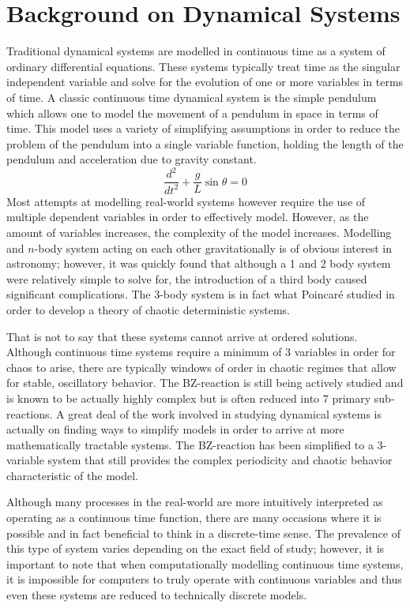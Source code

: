 \section{Background on Dynamical Systems}
Traditional dynamical systems are modelled in continuous time as a system of ordinary differential equations. These systems typically treat time as the singular independent variable and solve for the evolution of one or more variables in terms of time. A classic continuous time dynamical system is the simple pendulum which allows one to model the movement of a pendulum in space in terms of time. This model uses a variety of simplifying assumptions in order to reduce the problem of the pendulum into a single variable function, holding the length of the pendulum and acceleration due to gravity constant.
\begin{equation}
    \frac{d^2}{dt^2}+\frac{g}{L}\sin\theta=0
\end{equation}
Most  attempts  at  modelling  real-world  systems  however  require  the  use  of  multiple dependent variables in order to effectively model.  However, as the amount of variables increases, the complexity of the model increases.  Modelling and $n$-body system acting on each other gravitationally is of obvious interest in astronomy; however, it was quickly found  that  although  a  1  and  2  body  system  were  relatively  simple  to  solve  for,  the introduction of a third body caused significant complications.  The 3-body system is in fact what Poincar\'e studied in order to develop a theory of chaotic deterministic systems\autocite{Poincare1993}.

That is not to say that these systems cannot arrive at ordered solutions.  Although continuous time systems require a minimum of 3 variables in order for chaos to arise, there are typically windows of order in chaotic regimes that allow for stable, oscillatory behavior. The BZ-reaction is still being actively studied and is known to be actually highly complex but is often reduced into 7 primary sub-reactions\autocite{Field1986}. A great deal of the work involved in studying dynamical systems is actually on finding ways to simplify models in order to arrive at more mathematically tractable systems. The BZ-reaction has been simplified to a 3-variable system that still provides the complex periodicity and chaotic behavior characteristic of the model\autocite{Gyorgyi1992}.

Although many processes in the real-world are more intuitively interpreted as operating as a continuous time  function, there are many  occasions where it is possible and  in fact beneficial to think in a discrete-time sense. The prevalence of this type of system varies depending on the exact field of study; however, it is important to note that when computationally modelling continuous time systems, it is impossible for computers to truly operate with continuous variables and thus even these systems are reduced to technically discrete models.

